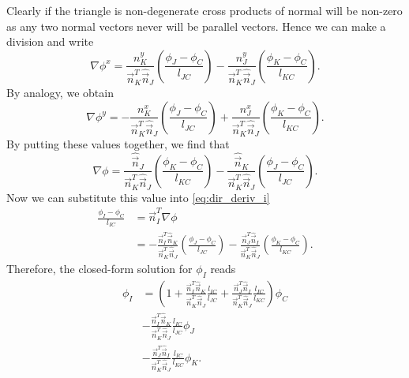 \documentclass[preprint,nocopyrightspace]{sigplanconf}
\begin{document}
Clearly if the triangle is non-degenerate cross products of normal
will be non-zero as any two normal vectors never will be parallel
vectors. Hence we can make a division and write
\begin{equation}
  \nabla \phi^x 
  =
  \frac{n_K^y}{ \vec n_K^T \hat{\vec n}_J} 
  \left(\frac{\phi_J-\phi_C}{l_{JC}} \right) 
  -
  \frac{n_J^y}{ \vec n_K^T \hat{\vec n}_J} 
  \left(\frac{\phi_K-\phi_C}{l_{KC}} \right) 
 .
\end{equation}
By analogy, we obtain
\begin{equation}
\nabla \phi^y 
=
-
  \frac{n_K^x}{ \vec n_K^T \hat{\vec n}_J} 
\left(\frac{\phi_J-\phi_C}{l_{JC}} \right)
 +
  \frac{n_J^x}{ \vec n_K^T \hat{\vec n}_J} 
\left(\frac{\phi_K-\phi_C}{l_{KC}} \right) .
\end{equation}
By putting these values together, we find that
\begin{equation}
  \nabla \phi 
  =
  \frac{\hat{\vec n}_J}{ \vec n_K^T \hat{\vec n}_J} 
  \left(\frac{\phi_K-\phi_C}{l_{KC}} \right) 
  -
  \frac{\hat{\vec n}_K}{ \vec n_K^T \hat{\vec n}_J} 
  \left(\frac{\phi_J-\phi_C}{l_{JC}} \right)
   .
\end{equation}
Now we can substitute this value into \eqref{eq:dir_deriv_i}
\begin{align}
  \frac{\phi_I - \phi_C}{l_{IC}} 
  &=
  \vec n_I^T \nabla \phi 
  \\
  {} 
  &
  =
  -
  \frac{\vec{n}_I^T \hat{\vec{n}}_K}{\vec{n}_K^T \hat{\vec{n}}_J}
  \left(\frac{\phi_J-\phi_C}{l_{JC}} \right)
  -
  \frac{\vec{n}_J^T \hat{\vec{n}}_I}{\vec{n}_K^T \hat{\vec{n}}_J}
  \left(\frac{\phi_K-\phi_C}{l_{KC}} \right).
\end{align} 
Therefore, the closed-form solution for
$\phi_I$ reads
\begin{equation}
  \label{eq:phi_i_closed_form}
  \begin{split}
    \phi_I &=
    \left(
      1 
      +
      \frac{
         \vec{n}_I^T \hat{\vec{n}}_K
       }{
         \vec{n}_K^T\hat{\vec{n}}_J
       } 
      \frac{
         l_{IC}
       }{
         l_{JC}
       } 
      +
      \frac{
        \vec{n}_J^T \hat{\vec{n}}_I
      }{
        \vec{n}_K^T\hat{\vec{n}}_J
      } 
      \frac{
        l_{IC}
      }{
        l_{KC}
      } 
    \right)\phi_C
    \\
    &-
      \frac{
         \vec{n}_I^T \hat{\vec{n}}_K
       }{
         \vec{n}_K^T\hat{\vec{n}}_J
       } 
      \frac{
         l_{IC}
       }{
         l_{JC}
       } 
    \phi_J
    \\
    & -
      \frac{
        \vec{n}_J^T \hat{\vec{n}}_I
      }{
        \vec{n}_K^T\hat{\vec{n}}_J
      } 
      \frac{
        l_{IC}
      }{
        l_{KC}
      } 
      \phi_K.    
  \end{split}
\end{equation}
\end{document}
